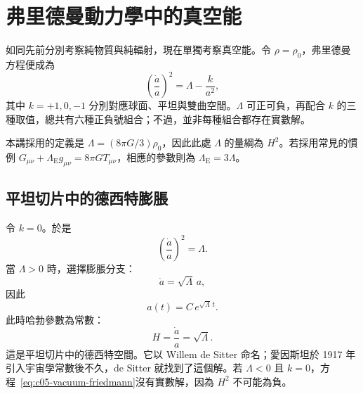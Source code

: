 \begin{classroomqa}
\end{classroomqa}

\section{弗里德曼動力學中的真空能}

如同先前分別考察純物質與純輻射，現在單獨考察真空能。令 \(\rho=\rho_0\)，弗里德曼方程便成為
\begin{equation}
\left(\frac{\dot a}{a}\right)^2=\Lambda-\frac{k}{a^2},
\label{eq:c05-vacuum-friedmann}
\end{equation}
其中 \(k=+1,0,-1\) 分別對應球面、平坦與雙曲空間。\(\Lambda\) 可正可負，再配合 \(k\) 的三種取值，總共有六種正負號組合；不過，並非每種組合都存在實數解。

\begin{remark}
本講採用的定義是 \(\Lambda=(8\pi G/3)\rho_0\)，因此此處 \(\Lambda\) 的量綱為 \(H^2\)。若採用常見的慣例 \(G_{\mu\nu}+\Lambda_{\mathrm E}g_{\mu\nu}=8\pi G T_{\mu\nu}\)，相應的參數則為 \(\Lambda_{\mathrm E}=3\Lambda\)。
\end{remark}

\subsection{平坦切片中的德西特膨脹}

令 \(k=0\)。於是
\begin{equation}
\left(\frac{\dot a}{a}\right)^2=\Lambda.
\end{equation}
當 \(\Lambda>0\) 時，選擇膨脹分支：
\begin{equation}
\dot a=\sqrt{\Lambda}\,a,
\end{equation}
因此
\begin{equation}
a(t)=C\,e^{\sqrt{\Lambda}\,t}.
\end{equation}
此時哈勃參數為常數：
\begin{equation}
H=\frac{\dot a}{a}=\sqrt{\Lambda}.
\end{equation}
這是平坦切片中的德西特空間。它以 Willem de Sitter 命名；愛因斯坦於 1917 年引入宇宙學常數後不久，de Sitter 就找到了這個解。若 \(\Lambda<0\) 且 \(k=0\)，方程~\eqref{eq:c05-vacuum-friedmann}沒有實數解，因為 \(H^2\) 不可能為負。

